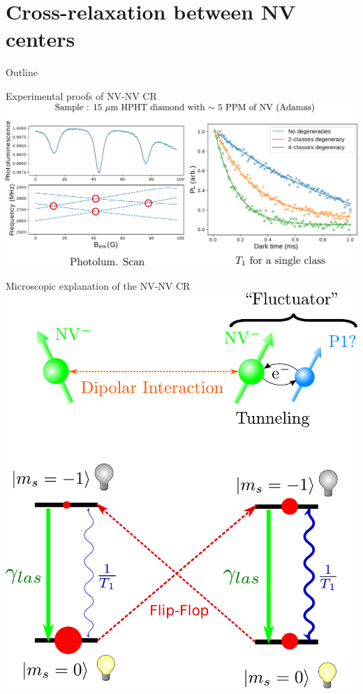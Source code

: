 \documentclass{beamer}
\begin{document}
\section{Cross-relaxation between NV centers}
\begin{frame}{Outline}
\tableofcontents[currentsection]
\end{frame}
\begin{frame}{Experimental proofs of NV-NV CR}
\includegraphics[scale=.28]{NV-NV_0}
\end{frame}
\begin{frame}{Microscopic explanation of the NV-NV CR}
\centering
\includegraphics[scale=.35]{NVNV-micro}
\end{frame}
\end{document}
